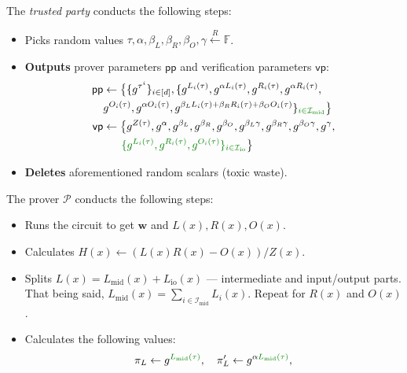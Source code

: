 \documentclass[../lecture-notes-148x210.tex]{subfiles}
\begin{document}
\begin{tcolorbox}
    The \emph{trusted party} conducts the following steps:
    \begin{itemize}[label=]
        \item Picks random values $\tau, \alpha, \beta_L, \beta_R, \beta_O, \gamma \xleftarrow{R} \mathbb{F}$.
        \item \textbf{Outputs} prover parameters $\mathsf{pp}$ and verification parameters $\mathsf{vp}$:
        \begin{equation*}        
            \begin{aligned}
                \mathsf{pp} & \gets \big\{\{g^{\tau^i}\}_{i \in [d]}, \{g^{L_i(\tau)}, g^{\alpha L_i(\tau)}, g^{R_i(\tau)}, g^{\alpha R_i(\tau)}, \\ 
                            & g^{O_i(\tau)}, g^{\alpha O_i(\tau)}, g^{\beta_LL_i(\tau)+\beta_RR_i(\tau)+\beta_OO_i(\tau)}\}_{\textcolor{green!50!black}{i \in \mathcal{I}_{\text{mid}}}}\big\} \\
                \mathsf{vp} & \gets \big\{ g^{Z(\tau)}, g^{\alpha}, g^{\beta_L}, g^{\beta_R}, g^{\beta_O}, g^{\beta_L\gamma}, g^{\beta_R\gamma}, g^{\beta_O\gamma}, g^{\gamma}, \\
                            & \;\;\;\;\;\; \textcolor{green!50!black}{ \{g^{L_i(\tau)}, g^{R_i(\tau)}, g^{O_i(\tau)}\}_{i \in \mathcal{I}_{\text{io}}} } \big\}
            \end{aligned}
        \end{equation*}
    \item \textbf{Deletes} aforementioned random scalars (toxic waste).
    \end{itemize}
    The prover $\mathcal{P}$ conducts the following steps:
    \begin{itemize}[label=]
        \item Runs the circuit to get $\mathbf{w}$ and $L(x),R(x),O(x)$.
        \item Calculates $H(x) \gets (L(x)R(x) - O(x))\big/ Z(x)$.
        \item \textcolor{green!50!black}{Splits $L(x) = L_{\text{mid}}(x) + L_{\text{io}}(x)$ --- intermediate and input/output parts. That being said, $L_{\text{mid}}(x) = \sum_{i \in \mathcal{I}_{\text{mid}}}L_i(x)$. Repeat for $R(x)$ and $O(x)$.}
        \item Calculates the following values: 
        \begin{align*}
            \pi_L \gets g^{\textcolor{green!50!black}{L_{\text{mid}}(\tau)}}, \quad \pi_L' \gets g^{\alpha \textcolor{green!50!black}{L_{\text{mid}}(\tau)}}, \\

\end{align*}
\end{itemize}
\end{tcolorbox}
\end{document}
